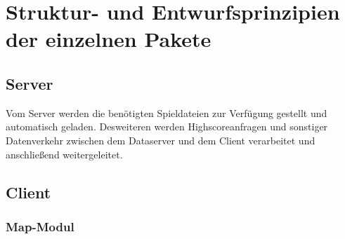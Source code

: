 \documentclass[11pt,a4paper]{article}
\begin{document}
\section{Struktur- und Entwurfsprinzipien der einzelnen Pakete}
\subsection{Server} Vom Server werden die benötigten Spieldateien zur Verfügung gestellt und automatisch geladen. Desweiteren werden Highscoreanfragen und sonstiger Datenverkehr zwischen dem Dataserver und dem Client verarbeitet und anschließend weitergeleitet.

\subsection{Client}
\subsubsection{Map-Modul}
\end{document}
